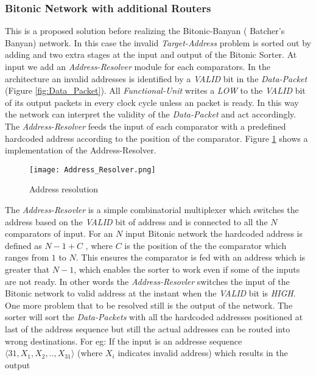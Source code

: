 				  \subsubsection{Bitonic Network with additional Routers}
					      This is a proposed solution before realizing the Bitonic-Banyan \cite{batcher_banyan_ref}( Batcher's Banyan)  network. In this case the invalid \textit{Target-Address} problem is sorted
					      out by adding and two extra stages at the input and output of the Bitonic Sorter. At input we add an \textit{Address-Resolver} module for each comparators. In the architecture an invalid addresses
					      is identified by a \textit{VALID} bit in the \textit{Data-Packet} (Figure \ref{fig:Data_Packet}). All \textit{Functional-Unit} writes a \textit{LOW} to the \textit{VALID} bit of its output packets in every clock cycle unless an packet is ready. 
					      In this way the network can interpret the validity of the \textit{Data-Packet} and act accordingly. The \textit{Address-Resolver} feeds the input of each comparator with a predefined hardcoded address according to the position of the comparator. 
					      Figure \ref{fig:Address_Resolver} shows a implementation of the Address-Resolver.
					      \begin{figure}[!ht]
							\texttt{[image: Address\_Resolver.png]}
						      \caption{Address resolution}
					      \label{fig:Address_Resolver}
					      \end{figure}
					      The \textit{Address-Resovler} is a simple combinatorial multiplexer which switches the address based on the \textit{VALID} bit of address and is connected to all the $N$ comparators of input.
					      For an $N$ input Bitonic network the hardcoded address is defined as $N -1 + C$ , where $C$ is the position of the the comparator which ranges from $1$ to $N$. This ensures the 
					      comparator is fed with an address which is greater that $N -1$, which enables the sorter to work even if some of the inputs are not ready. In other words the \textit{Address-Resovler}
					      switches the input of the Bitonic network to  valid address at the instant when the \textit{VALID} bit is \textit{HIGH}. One  more problem that to be resolved
					      still is the output of the network. The sorter will sort the \textit{Data-Packets} with all the hardcoded addresses positioned at last of the address sequence but still the actual addresses can
					      be routed into wrong destinations. For eg: If the input is an addresse sequence $\langle31,X_{1},X_{2},..,X_{31}\rangle$ (where $X_{i}$ indicates invalid address) which results in the output 
